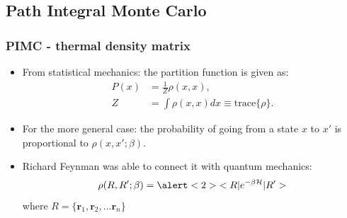 \documentclass[xcolor=svgnames]{beamer}
\DeclareRobustCommand{\mc}[1]{\mathcal{#1}}
\begin{document}
	\subsection{Path Integral Monte Carlo}
        \begin{frame}
            \frametitle{PIMC - thermal density matrix}
            \begin{itemize}
                \justifying
                \item From statistical mechanics: the partition function is given as:
                \begin{equation*}
                    \begin{aligned}
                        P(x) &= \frac{1}{Z} \rho(x,x),\\
                        Z &= \int \rho(x,x) dx \equiv \text{trace} \{\rho\}.
                    \end{aligned}
                \end{equation*}
                \item For the more general case: the probability of going from a state $x$ to $x'$ is proportional to $\rho (x, x'; \beta)$.
                \item Richard Feynman was able to connect it with quantum mechanics:
                \begin{equation*}\label{eq:rho}
                    \rho (R , R' ; \beta) = \alert<2>{< R | e^{- \beta \mc{H} } | R' >}
                \end{equation*}
                where $R = \{\bm{r}_1, \bm{r}_2, \ldots \bm{r}_n\}$
            \end{itemize}
        \end{frame}
\end{document}
